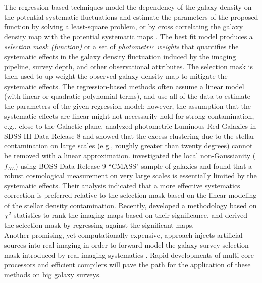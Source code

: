 \documentclass[fleqn, usenatbib]{mnras}
\begin{document}
The regression based techniques model the dependency of the galaxy density on the potential systematic fluctuations and estimate the parameters of the proposed function by solving a least-square problem, or by cross correlating the galaxy density map with the potential systematic maps \citep[see e.g.][]{ross2011ameliorating, ashley2012MNRAS,Ross17,2012ApJ...761...14H,delubac2016sdss, prakash2016sdss, Raichoor2017MNRAS.471.3955R, laurent2017clustering, Elvin18}. The best fit model produces a \textit{selection mask (function)} or a set of \textit{photometric weights} that quantifies the systematic effects in the galaxy density fluctuation induced by the imaging pipeline, survey depth, and other observational attributes. The selection mask is then used to up-weight the observed galaxy density map to mitigate the systematic effects. The regression-based methods often assume a linear model (with linear or quadratic polynomial terms), and use all of the data to estimate the parameters of the given regression model; however, the assumption that the systematic effects are linear might not necessarily hold for strong contamination, e.g., close to the Galactic plane. \citet{2012ApJ...761...14H} analyzed photometric Luminous Red Galaxies in SDSS-III Data Release 8 and showed that the excess clustering due to the stellar contamination on large scales (e.g., roughly greater than twenty degrees) cannot be removed with a linear approximation. \citet{rossfNL} investigated the local non-Gaussianity ($f_{NL}$) using BOSS Data Release 9 ``CMASS" sample of galaxies \citep{ahn2012ninth} and found that a robust cosmological measurement on very large scales is essentially limited by the systematic effects. Their analysis indicated that a more effective systematics correction is preferred relative to the selection mask based on the linear modeling of the stellar density contamination. Recently, \citet{Elvin18} developed a methodology based on $\chi^{2}$ statistics to rank the imaging maps based on their significance, and derived the selection mask by regressing against the significant maps.\\

Another promising, yet computationally expensive, approach injects artificial sources into real imaging in order to forward-model the galaxy survey selection mask introduced by real imaging systematics \citep[see e.g.][]{berge2013ultra,Balrog}. Rapid developments of multi-core processors and efficient compilers will pave the path for the application of these methods on big galaxy surveys.\\
\end{document}
